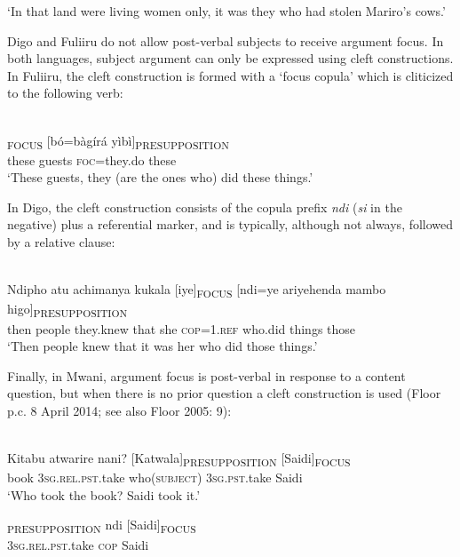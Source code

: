 \documentclass[output=paper]{langsci/langscibook}
\begin{document}
\glt \textup{‘}\textup{In that land were living women only, it was they who had stolen Mariro’s cows.’}
\z

 Digo and Fuliiru do not allow post-verbal subjects to receive argument focus. In both languages, subject argument can only be expressed using cleft constructions. In Fuliiru, the cleft construction is formed with a ‘focus copula’ which is cliticized to the following verb:

\ea\label{ex:}
\\
\textsubscript{FOCUS} [bó=bàgírá yìbì]\textsubscript{PRESUPPOSITION}\\
these guests \textsc{foc}=they.do these\\


\glt \textup{‘}\textup{These guests, they (are the ones who) did these things.’}
\z

In Digo, the cleft construction consists of the copula prefix \textit{ndi} (\textit{si} in the negative) plus a referential marker, and is typically, although not always, followed by a relative clause:

\ea\label{ex:}
\\
\gll Ndipho atu achimanya kukala [iye]\textsubscript{FOCUS} [ndi=ye ariyehenda mambo higo]\textsubscript{PRESUPPOSITION}\\
then people they.knew that she \textsc{cop=1.ref} who\textsc{.}did things those\\


\glt \textup{‘}\textup{Then people knew that it was her who did those things.’}
\z

Finally, in Mwani, argument focus is post-verbal in response to a content question, but when there is no prior question a cleft construction is used (Floor p.c. 8 April 2014; see also Floor 2005: 9):

\ea\label{ex:}
\\
\gll Kitabu atwarire nani? [Katwala]\textsubscript{PRESUPPOSITION} [Saidi]\textsubscript{FOCUS}\\
book 3\textsc{sg.rel.pst}.take who(\textsc{subject}) 3\textsc{sg.pst}.take Saidi\\


\glt \textup{‘}\textup{Who took the book? Saidi took it.’}
\z

\ea
\gll [Atwarire]\textsubscript{PRESUPPOSITION} ndi [Saidi]\textsubscript{FOCUS}\\
\textsc{3sg.rel.pst}.take \textsc{cop }Saidi\\
\end{document}
